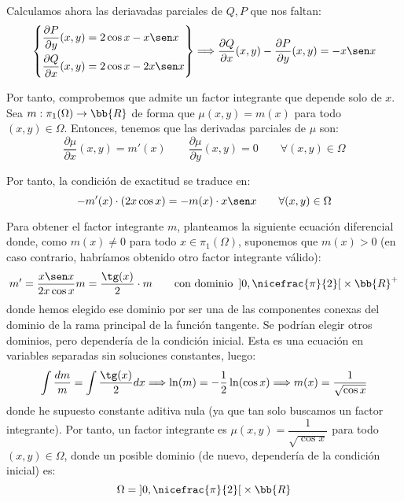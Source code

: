 \begin{ejercicio}
\begin{enumerate}
        Calculamos ahora las deriavadas parciales de $Q,P$ que nos faltan:
        \begin{equation*}
            \left\{
                \begin{aligned}
                    \frac{\partial P}{\partial y}(x,y) &= 2\cos x - x\sen x\\
                    \frac{\partial Q}{\partial x}(x,y) &= 2\cos x - 2x\sen x
                \end{aligned}
            \right\}
            \Longrightarrow
            \dfrac{\partial Q}{\partial x}(x,y)-\dfrac{\partial P}{\partial y}(x,y) = -x\sen x
        \end{equation*}

        Por tanto, comprobemos que admite un factor integrante que depende solo de $x$. Sea $m:\pi_1(\Omega)\to \bb{R}$ de forma que $\mu(x,y)=m(x)$ para todo $(x,y)\in\Omega$. Entonces, tenemos que las derivadas parciales de $\mu$ son:
        \begin{equation*}
            \dfrac{\partial \mu}{\partial x}(x,y)=m'(x)\qquad \dfrac{\partial \mu}{\partial y}(x,y)=0\qquad \forall (x,y)\in\Omega
        \end{equation*}

        Por tanto, la condición de exactitud se traduce en:
        \begin{equation*}
            -m'(x)\cdot (2x\cos x) = -m(x)\cdot x\sen x \qquad \forall (x,y)\in\Omega
        \end{equation*}

        Para obtener el factor integrante $m$, planteamos la siguiente ecuación diferencial donde, como $m(x)\neq 0$ para todo $x\in\pi_1(\Omega)$, suponemos que $m(x)>0$ (en caso contrario, habríamos obtenido otro factor integrante válido):
        \begin{equation*}
            m'=\dfrac{x\sen x}{2x\cos x} m
            = \dfrac{\tg(x)}{2}\cdot m            
            \qquad \text{con dominio } \left]0,\nicefrac{\pi}{2}\right[\times \bb{R}^+
        \end{equation*}
        donde hemos elegido ese dominio por ser una de las componentes conexas del dominio de la rama principal de la función tangente. Se podrían elegir otros dominios, pero dependería de la condición inicial. Esta es una ecuación en variables separadas sin soluciones constantes, luego:
        \begin{align*}
            \int \frac{dm}{m} = \int \frac{\tg(x)}{2}dx
            \Longrightarrow \ln (m) = -\frac{1}{2}\ln (\cos x)
            \Longrightarrow m(x) = \frac{1}{\sqrt{\cos x}}
        \end{align*}
        donde he supuesto constante aditiva nula (ya que tan solo buscamos un factor integrante). Por tanto, un factor integrante es $\mu(x,y)=\dfrac{1}{\sqrt{\cos x}}$ para todo $(x,y)\in\Omega$, donde un posible dominio (de nuevo, dependería de la condición inicial) es:
        \begin{equation*}
            \Omega=\left]0,\nicefrac{\pi}{2}\right[\times \bb{R}
        \end{equation*}


\end{enumerate}
\end{ejercicio}
